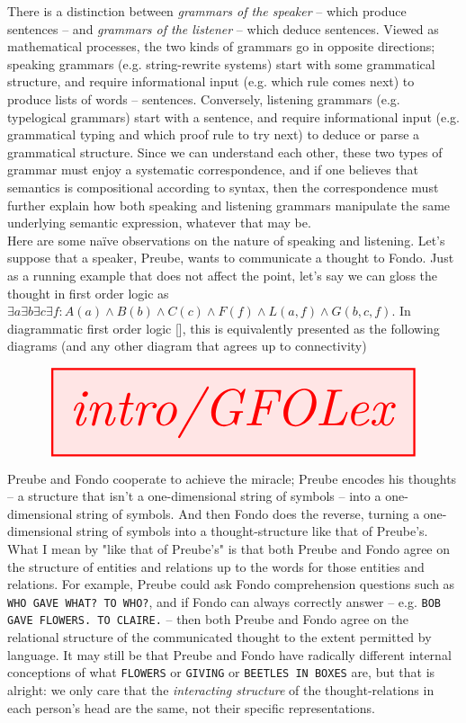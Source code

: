 \begin{fullwidth}
There is a distinction between \emph{grammars of the speaker} -- which produce sentences -- and \emph{grammars of the listener} -- which deduce sentences. Viewed as mathematical processes, the two kinds of grammars go in opposite directions; speaking grammars (e.g. string-rewrite systems) start with some grammatical structure, and require informational input (e.g. which rule comes next) to produce lists of words -- sentences. Conversely, listening grammars (e.g. typelogical grammars) start with a sentence, and require informational input (e.g. grammatical typing and which proof rule to try next) to deduce or parse a grammatical structure. Since we can understand each other, these two types of grammar must enjoy a systematic correspondence, and if one believes that semantics is compositional according to syntax, then the correspondence must further explain how both speaking and listening grammars manipulate the same underlying semantic expression, whatever that may be.\\

Here are some na\"{i}ve observations on the nature of speaking and listening. Let's suppose that a speaker, Preube, wants to communicate a thought to Fondo. Just as a running example that does not affect the point, let's say we can gloss the thought in first order logic as $\exists a \exists b \exists c \exists f : A(a) \wedge B(b) \wedge C(c) \wedge F(f) \wedge L(a,f) \wedge G(b,c,f)$. In diagrammatic first order logic [], this is equivalently presented as the following diagrams (and any other diagram that agrees up to connectivity)

\[\resizebox{\textwidth}{!}{\tikzfig{intro/GFOLex}}\]

Preube and Fondo cooperate to achieve the miracle; Preube encodes his thoughts -- a structure that isn't a one-dimensional string of symbols -- into a one-dimensional string of symbols. And then Fondo does the reverse, turning a one-dimensional string of symbols into a thought-structure like that of Preube's. What I mean by "like that of Preube's" is that both Preube and Fondo agree on the structure of entities and relations up to the words for those entities and relations. For example, Preube could ask Fondo comprehension questions such as \texttt{WHO GAVE WHAT? TO WHO?}, and if Fondo can always correctly answer -- e.g. \texttt{BOB GAVE FLOWERS. TO CLAIRE.} -- then both Preube and Fondo agree on the relational structure of the communicated thought to the extent permitted by language. It may still be that Preube and Fondo have radically different internal conceptions of what \texttt{FLOWERS} or \texttt{GIVING} or \texttt{BEETLES IN BOXES} are, but that is alright: we only care that the \emph{interacting structure} of the thought-relations in each person's head are the same, not their specific representations.\\


\end{fullwidth}
